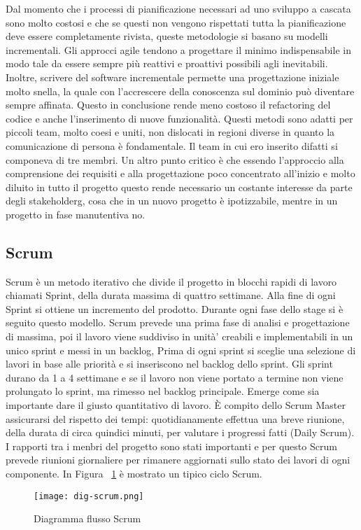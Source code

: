 Dal momento che i processi di pianificazione necessari ad uno sviluppo a cascata sono molto costosi e che se questi non vengono rispettati tutta la pianificazione deve essere completamente rivista, queste metodologie si basano su modelli incrementali. Gli approcci agile tendono a progettare il minimo indispensabile in modo tale da essere sempre più reattivi e proattivi possibili agli inevitabili. Inoltre, scrivere del software incrementale permette una progettazione iniziale molto snella, la quale con l’accrescere della conoscenza sul dominio può diventare sempre affinata. Questo in conclusione rende meno costoso il refactoring del codice e anche l’inserimento di nuove funzionalità. 
Questi metodi sono adatti per piccoli team, molto coesi e uniti, non dislocati in regioni diverse in quanto la comunicazione di persona è fondamentale. Il team in cui ero inserito difatti si componeva di tre membri.
Un altro punto critico è che essendo l’approccio alla comprensione dei requisiti e alla progettazione poco concentrato all’inizio e molto diluito in tutto il progetto questo rende necessario un costante interesse da parte degli \gls{stakeholderg}, cosa che in un nuovo progetto è ipotizzabile, mentre in un progetto in fase manutentiva no.
\subsection{Scrum}
Scrum è un metodo iterativo che divide il progetto in blocchi rapidi di lavoro chiamati
Sprint, della durata massima di quattro settimane. Alla fine di ogni Sprint si ottiene
un incremento del prodotto. Durante ogni fase dello stage si è seguito questo modello. 
Scrum prevede una prima fase di analisi e progettazione di massima, poi il lavoro viene suddiviso in unità’ creabili e implementabili in un unico sprint e messi in un backlog, Prima di ogni sprint si sceglie una selezione di lavori in base alle priorità e si inseriscono nel backlog dello sprint. Gli sprint durano da 1 a 4 settimane e se il lavoro non viene portato a termine non viene prolungato lo sprint, ma rimesso nel backlog principale. Emerge come sia importante dare il giusto quantitativo di lavoro. È compito dello
Scrum Master assicurarsi del rispetto dei tempi: quotidianamente effettua una breve
riunione, della durata di circa quindici minuti, per valutare i progressi fatti (Daily
Scrum). I rapporti tra i menbri del progetto sono stati importanti e per questo Scrum prevede riunioni giornaliere per rimanere aggiornati sullo stato dei lavori di ogni componente.
In Figura ~\ref{fig:scrum} è mostrato un tipico ciclo Scrum.
\begin{figure}[!h]   
    \centering
    \texttt{[image: dig-scrum.png]} 
    \caption{Diagramma flusso Scrum}
    \label{fig:scrum} 
\end{figure}